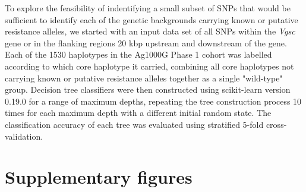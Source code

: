 \documentclass[a4paper,11pt,abstracton,hidelinks]{scrartcl}
\newcommand{\beginsupplement}{%
  \setcounter{table}{0}
  \renewcommand{\thetable}{S\arabic{table}}%
  \setcounter{figure}{0}
  \renewcommand{\thefigure}{S\arabic{figure}}%
}
\begin{document}
To explore the feasibility of indentifying a small subset of SNPs that would be sufficient to identify each of the genetic backgrounds carrying known or putative resistance alleles, we started with an input data set of all SNPs within the \textit{Vgsc} gene or in the flanking regions 20 kbp upstream and downstream of the gene.
%
Each of the 1530 haplotypes in the Ag1000G Phase 1 cohort was labelled according to which core haplotype it carried, combining all core haplotypes not carrying known or putative resistance alleles together as a single "wild-type" group.
%
Decision tree classifiers were then constructed using scikit-learn version 0.19.0 \cite{Pedregosa2011} for a range of maximum depths, repeating the tree construction process 10 times for each maximum depth with a different initial random state.
%
The classification accuracy of each tree was evaluated using stratified 5-fold cross-validation.
%


\printbibliography

\beginsupplement
\section*{Supplementary figures}

\clearpage
\end{document}
